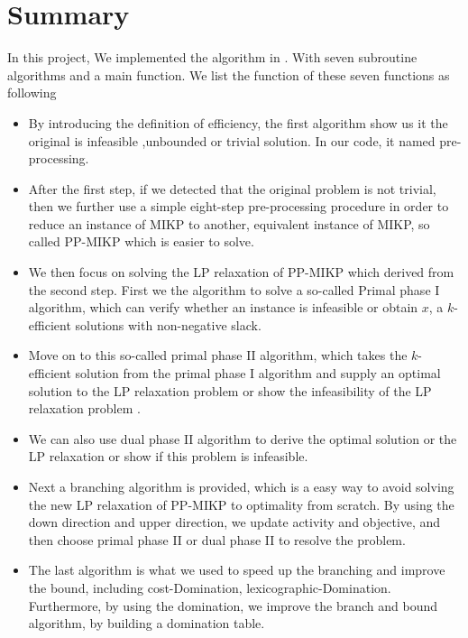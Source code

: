 \documentclass[a4paper,11pt]{article}
\begin{document}
\section{Summary}
In this project, We implemented the algorithm in \cite{fukasawa2011exact}. With seven subroutine algorithms and a main function. We list the function of these seven functions as following
\begin{itemize}
\item By introducing the definition of efficiency, the first algorithm show us it the original is infeasible ,unbounded or trivial solution. In our code, it named pre-processing.
\item After the first step, if we detected that the original problem is not trivial, then we further use a simple eight-step pre-processing procedure in order to reduce an instance of MIKP to another, equivalent
instance of MIKP, so called PP-MIKP which is easier to solve.
\item We then focus on solving the LP relaxation of PP-MIKP which derived from the second step. First we the algorithm to solve a so-called Primal phase I algorithm, which can verify whether an instance is infeasible or obtain $x$, a $k$-efficient solutions with non-negative slack.
\item Move on to this so-called primal phase II algorithm, which takes the $k$-efficient solution from the primal phase I algorithm and supply an optimal solution to the LP relaxation problem or show the infeasibility of the LP relaxation problem .
\item We can also use dual phase II algorithm to derive the optimal solution or the LP relaxation or show if this problem is infeasible.
\item Next a branching algorithm is provided, which is a easy way to avoid solving the new LP relaxation of PP-MIKP to optimality from scratch. By using the down direction and upper direction, we update activity and objective, and then choose primal phase II or dual phase II to resolve the problem.
\item The last algorithm is what we used to speed up the branching and improve the bound, including cost-Domination, lexicographic-Domination. Furthermore, by using the domination, we improve the branch and bound algorithm, by building a domination table. 
\end{itemize}
\end{document}
